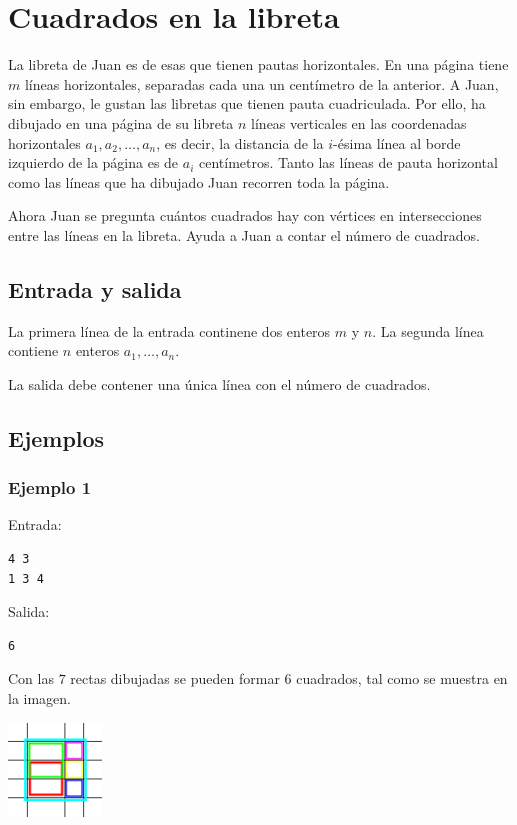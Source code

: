 \documentclass[10.5pt]{article}
\begin{document}
\section*{Cuadrados en la libreta}

La libreta de Juan es de esas que tienen pautas horizontales. En una p\'agina tiene $m$ l\'ineas horizontales, separadas cada una un cent\'imetro de la anterior. A Juan, sin embargo, le gustan las libretas que tienen pauta cuadriculada. Por ello, ha dibujado en una p\'agina de su libreta $n$ l\'ineas verticales en las coordenadas horizontales $a_1, a_2, \ldots, a_n$, es decir, la distancia de la $i$-\'esima l\'inea al borde izquierdo de la p\'agina es de $a_i$ cent\'imetros. Tanto las l\'ineas de pauta horizontal como las l\'ineas que ha dibujado Juan recorren toda la p\'agina.

Ahora Juan se pregunta cu\'antos cuadrados hay con v\'ertices en intersecciones entre las l\'ineas en la libreta. Ayuda a Juan a contar el n\'umero de cuadrados.


\subsection*{Entrada y salida}

La primera l\'inea de la entrada continene dos enteros $m$ y $n$. La segunda l\'inea contiene $n$ enteros $a_1, \ldots, a_n$.

La salida debe contener una \'unica l\'inea con el n\'umero de cuadrados.

\subsection*{Ejemplos}
\subsubsection*{Ejemplo 1}

Entrada:
\begin{verbatim}
4 3
1 3 4
\end{verbatim}
Salida:
\begin{verbatim}
6
\end{verbatim}

Con las $7$ rectas dibujadas se pueden formar $6$ cuadrados, tal como se muestra en la imagen.

\includegraphics[width=2.5cm]{sample1.png}
\end{document}
